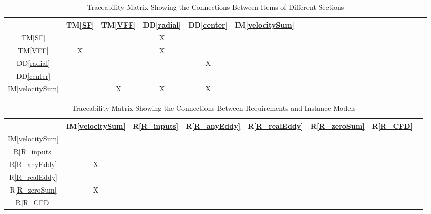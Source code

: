 \documentclass[12pt]{article}
\newcommand{\ddref}[1]{DD\ref{#1}}
\newcommand{\tref}[1]{TM\ref{#1}}
\newcommand{\iref}[1]{IM\ref{#1}}
\newcommand{\rref}[1]{R\ref{#1}}
\begin{document}
\begin{table}[h!]
\centering
\begin{tabular}{|c|c|c|c|c|c|c|c|c|c|c|c|c|c|c|c|c|c|c|c|c|c|c|c|}
\hline        
	& \tref{SF}& \tref{VFF}& \ddref{radial}& \ddref{center}& \iref{velocitySum} \\
\hline
\tref{SF}           & & &X& & \\ \hline
\tref{VFF}          &X& &X& & \\ \hline
\ddref{radial}      & & & &X& \\ \hline
\ddref{center}      & & & & & \\ \hline
\iref{velocitySum}  & &X&X&X& \\ \hline
\end{tabular}
\caption{Traceability Matrix Showing the Connections Between Items of Different Sections}
\label{Table:trace}
\end{table}

\begin{table}[h!]
\centering
\begin{tabular}{|c|c|c|c|c|c|c|c|}
\hline
	& \iref{velocitySum}& \rref{R_inputs}& \rref{R_anyEddy}& \rref{R_realEddy}& \rref{R_zeroSum}& \rref{R_CFD} \\
\hline
\iref{velocitySum}  & & & & & & \\ \hline
\rref{R_inputs}     & & & & & & \\ \hline
\rref{R_anyEddy}    &X& & & & & \\ \hline
\rref{R_realEddy}   & & & & & & \\ \hline
\rref{R_zeroSum}    &X& & & & & \\ \hline
\rref{R_CFD}        & & & & & & \\ \hline
\end{tabular}
\caption{Traceability Matrix Showing the Connections Between Requirements and Instance Models}
\label{Table:R_trace}
\end{table}

\end{document}
